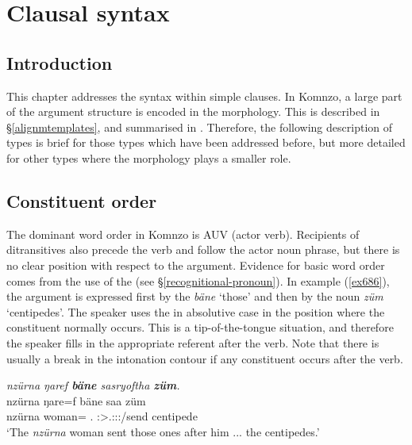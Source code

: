 
\chapter{Clausal syntax} \label{cha:clausalsyntax}

\section{Introduction}

This chapter addresses the syntax within simple clauses. In Komnzo, a large part of the argument structure is encoded in the  morphology. This is described in \S{}\ref{alignmtemplates}, and summarised in . Therefore, the following description of  types is brief for those types which have been addressed before, but more detailed for other types where the  morphology plays a smaller role.

\section{Constituent order}\label{constitorder}

The dominant word order in Komnzo is AUV (actor  verb). Recipients of ditransitives also precede the verb and follow the actor noun phrase, but there is no clear position with respect to the  argument. Evidence for basic word order comes from the use of the   (see \S{}\ref{recognitional-pronoun}). In example (\ref{ex686}), the  argument is expressed first by the  \emph{bäne} `those' and then by the noun \emph{züm} `centipedes'. The speaker uses the  in absolutive case in the position where the constituent normally occurs. This is a tip-of-the-tongue situation, and therefore the speaker fills in the appropriate referent after the verb. Note that there is usually a break in the intonation contour if any constituent occurs after the verb.

\begin{exe}
	\ex \emph{nzürna ŋaref \textbf{bäne} sasryoftha \textbf{züm}.}\\
	\gll nzürna ŋare=f bäne saa züm\\
	nzürna woman=\Erg{} \Recog.\Abs{} \Sg:\Sbj>\Tsg.\Masc:\Io:\Pst:\Pfv/send centipede\\
	\trans `The \emph{nzürna} woman sent those ones after him ... the centipedes.'\\
	\label{ex686}
\end{exe}


